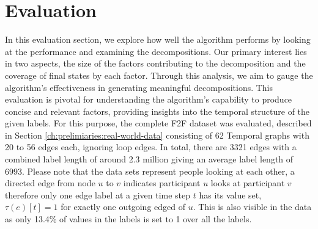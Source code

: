 
\chapter{Evaluation}
\label{ch:Evaluation}
In this evaluation section, we explore how well the algorithm performs by looking at the performance and examining the decompositions.
Our primary interest lies in two aspects, the size of the factors contributing to the decomposition and the coverage of final states by each factor.
Through this analysis, we aim to gauge the algorithm's effectiveness in generating meaningful decompositions.
This evaluation is pivotal for understanding the algorithm's capability to produce concise and relevant factors, providing insights into the temporal structure of the given labels.
For this purpose, the complete F2F dataset was evaluated, described in Section \ref{ch:prelimiaries:real-world-data} consisting of 62 Temporal graphs with 20 to 56 edges each, ignoring loop edges.
In total, there are 3321 edges with a combined label length of around 2.3 million giving an average label length of 6993.
Please note that the data sets represent people looking at each other, a directed edge from node $u$ to $v$ indicates participant $u$ looks at participant $v$ therefore only one edge label at a given time step $t$ has its value set, $\tau(e)[t] = 1$ for exactly one outgoing edged of $u$.
This is also visible in the data as only 13.4\% of values in the labels is set to 1 over all the labels.

